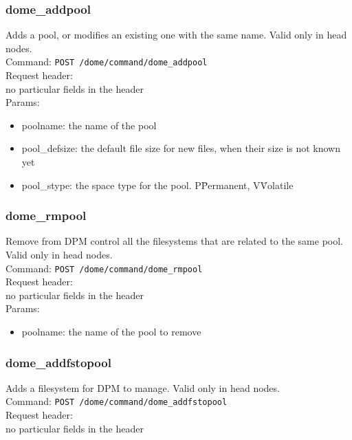 \documentclass[a4paper,10pt]{scrreprt}
\begin{document}
\subsubsection{dome\_addpool}
Adds a pool, or modifies an existing one with the same name. Valid only in head nodes.\\
Command:
\lstinline"POST /dome/command/dome_addpool"\\

Request header:\\
 no particular fields in the header\\

Params:
\begin{itemize}
 \item poolname: the name of the pool
 \item pool\_defsize: the default file size for new files, when their size is not known yet
 \item pool\_stype: the space type for the pool. P\=Permanent, V\=Volatile
\end{itemize}



\subsubsection{dome\_rmpool}
Remove from DPM control all the filesystems that are related to the same pool. Valid only in head nodes.\\
Command:
\lstinline"POST /dome/command/dome_rmpool"\\

Request header:\\
 no particular fields in the header\\

Params:
\begin{itemize}
 \item poolname: the name of the pool to remove
\end{itemize}


\subsubsection{dome\_addfstopool}
Adds a filesystem for DPM to manage. Valid only in head nodes.\\
Command:
\lstinline"POST /dome/command/dome_addfstopool"\\

Request header:\\
 no particular fields in the header\\
\end{document}
